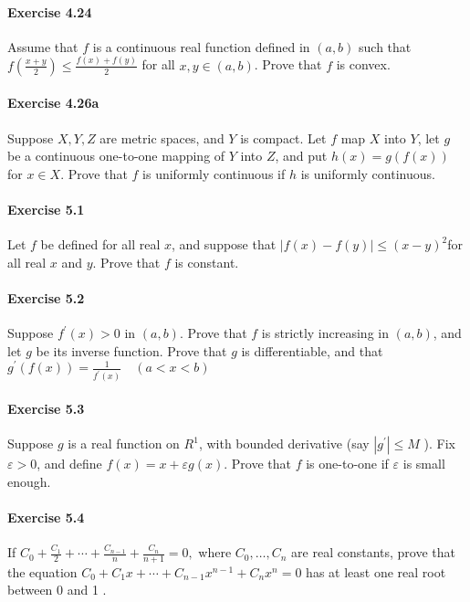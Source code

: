 \documentclass{article}
\begin{document}
\paragraph{Exercise 4.24} Assume that $f$ is a continuous real function defined in $(a, b)$ such that $f\left(\frac{x+y}{2}\right) \leq \frac{f(x)+f(y)}{2}$ for all $x, y \in(a, b)$. Prove that $f$ is convex.

\paragraph{Exercise 4.26a} Suppose $X, Y, Z$ are metric spaces, and $Y$ is compact. Let $f$ map $X$ into $Y$, let $g$ be a continuous one-to-one mapping of $Y$ into $Z$, and put $h(x)=g(f(x))$ for $x \in X$. Prove that $f$ is uniformly continuous if $h$ is uniformly continuous.

\paragraph{Exercise 5.1} Let $f$ be defined for all real $x$, and suppose that $|f(x)-f(y)| \leq(x-y)^{2}$for all real $x$ and $y$. Prove that $f$ is constant.

\paragraph{Exercise 5.2} Suppose $f^{\prime}(x)>0$ in $(a, b)$. Prove that $f$ is strictly increasing in $(a, b)$, and let $g$ be its inverse function. Prove that $g$ is differentiable, and that$g^{\prime}(f(x))=\frac{1}{f^{\prime}(x)} \quad(a<x<b)$

\paragraph{Exercise 5.3} Suppose $g$ is a real function on $R^{1}$, with bounded derivative (say $\left|g^{\prime}\right| \leq M$ ). Fix $\varepsilon>0$, and define $f(x)=x+\varepsilon g(x)$. Prove that $f$ is one-to-one if $\varepsilon$ is small enough.

\paragraph{Exercise 5.4} If $C_{0}+\frac{C_{1}}{2}+\cdots+\frac{C_{n-1}}{n}+\frac{C_{n}}{n+1}=0,$ where $C_{0}, \ldots, C_{n}$ are real constants, prove that the equation $C_{0}+C_{1} x+\cdots+C_{n-1} x^{n-1}+C_{n} x^{n}=0$ has at least one real root between 0 and 1 .
\end{document}
